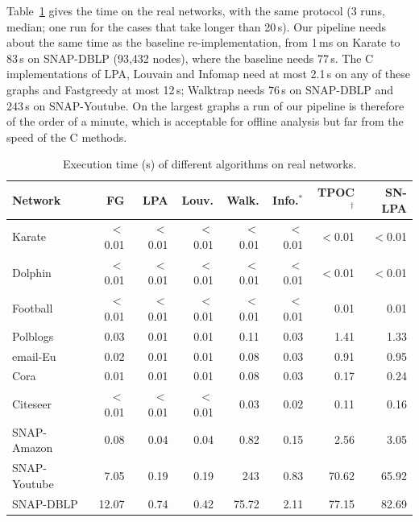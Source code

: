 \documentclass[conference]{IEEEtran}
\begin{document}
Table~\ref{tab:latreal} gives the time on the real networks, with the same protocol (3 runs, median; one run for the cases that take longer than 20\,s). Our pipeline needs about the same time as the baseline re-implementation, from 1\,ms on Karate to 83\,s on SNAP-DBLP (93,432 nodes), where the baseline needs 77\,s. The C implementations of LPA, Louvain and Infomap need at most 2.1\,s on any of these graphs and Fastgreedy at most 12\,s; Walktrap needs 76\,s on SNAP-DBLP and 243\,s on SNAP-Youtube. On the largest graphs a run of our pipeline is therefore of the order of a minute, which is acceptable for offline analysis but far from the speed of the C methods.

\begin{table}[!htbp]
\centering
\caption{Execution time (s) of different algorithms on real networks.}
\label{tab:latreal}
\scriptsize\setlength{\tabcolsep}{2.2pt}
\begin{tabular}{lrrrrrrr}
\toprule
Network & FG & LPA & Louv. & Walk. & Info.$^{*}$ & TPOC$^{\dagger}$ & SN-LPA \\
\midrule
Karate & $<$0.01 & $<$0.01 & $<$0.01 & $<$0.01 & $<$0.01 & $<$0.01 & $<$0.01 \\
Dolphin & $<$0.01 & $<$0.01 & $<$0.01 & $<$0.01 & $<$0.01 & $<$0.01 & $<$0.01 \\
Football & $<$0.01 & $<$0.01 & $<$0.01 & $<$0.01 & $<$0.01 & 0.01 & 0.01 \\
Polblogs & 0.03 & 0.01 & 0.01 & 0.11 & 0.03 & 1.41 & 1.33 \\
email-Eu & 0.02 & 0.01 & 0.01 & 0.08 & 0.03 & 0.91 & 0.95 \\
Cora & 0.01 & 0.01 & 0.01 & 0.08 & 0.03 & 0.17 & 0.24 \\
Citeseer & $<$0.01 & $<$0.01 & $<$0.01 & 0.03 & 0.02 & 0.11 & 0.16 \\
SNAP-Amazon & 0.08 & 0.04 & 0.04 & 0.82 & 0.15 & 2.56 & 3.05 \\
SNAP-Youtube & 7.05 & 0.19 & 0.19 & 243 & 0.83 & 70.62 & 65.92 \\
SNAP-DBLP & 12.07 & 0.74 & 0.42 & 75.72 & 2.11 & 77.15 & 82.69 \\
\bottomrule
\end{tabular}
\end{table}
\end{document}
